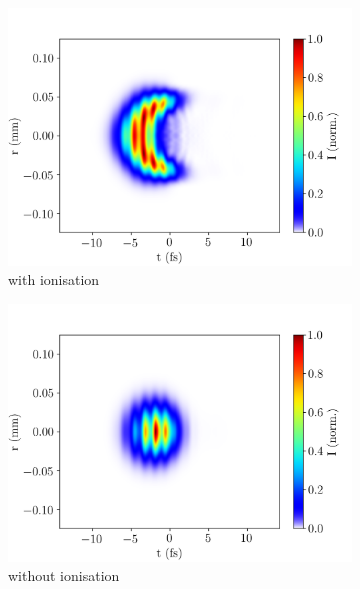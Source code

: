 \documentclass[a4paper]{jpconf}
\begin{document}
\begin{figure}[h]
\centering
 \begin{subfigure}{0.49\textwidth}
        \includegraphics[width=\textwidth]{im/UV_pulse_output_Ar_ion}
    \caption{with ionisation}
    \end{subfigure}
    \begin{subfigure}{0.49\textwidth}
        \includegraphics[width=\textwidth]{im/UV_pulse_output_Ar_no_ion}
    \caption{without ionisation}
    \end{subfigure}   
     \begin{subfigure}{0.49\textwidth}

\end{subfigure}
\end{figure}
\end{document}
